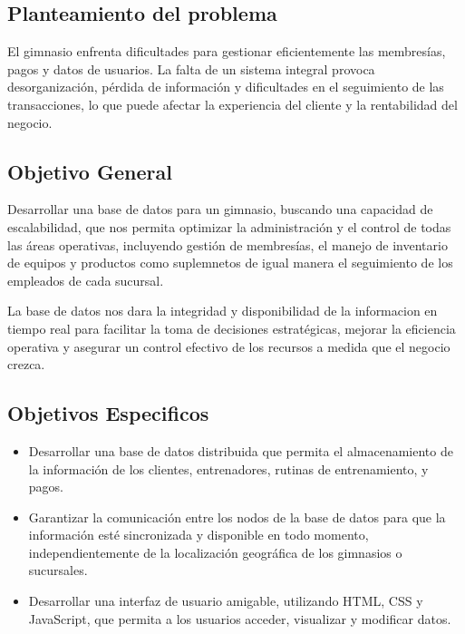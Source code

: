 \documentclass[spanish, 12pt]{article}
\providecommand{\tightlist}{\setlength{\itemsep}{0pt}
\setlength{\parskip}{0pt}}
\begin{document}
	\subsection{Planteamiento del problema}
	\label{planteamiento-del-problema}

	El gimnasio enfrenta dificultades para gestionar eficientemente las membresías,
	pagos y datos de usuarios. La falta de un sistema integral provoca
	desorganización, pérdida de información y dificultades en el seguimiento de las
	transacciones, lo que puede afectar la experiencia del cliente y la
	rentabilidad del negocio.

	\subsection{Objetivo General}
	\label{objetivo-general}

	Desarrollar una base de datos para un gimnasio, buscando una capacidad de
	escalabilidad, que nos permita optimizar la administración y el control de todas
	las áreas operativas, incluyendo gestión de membresías, el manejo de inventario
	de equipos y productos como suplemnetos de igual manera el seguimiento de los empleados
	de cada sucursal.

	La base de datos nos dara la integridad y disponibilidad de la informacion en tiempo
	real para facilitar la toma de decisiones estratégicas, mejorar la eficiencia
	operativa y asegurar un control efectivo de los recursos a medida que el
	negocio crezca.

	\subsection{Objetivos Especificos}
	\label{objetivos-especificos}

	\begin{itemize}
		\tightlist

		\item Desarrollar una base de datos distribuida que permita el almacenamiento
			de la información de los clientes, entrenadores, rutinas de entrenamiento,
			y pagos.

		\item Garantizar la comunicación entre los nodos de la base de datos para que
			la información esté sincronizada y disponible en todo momento,
			independientemente de la localización geográfica de los gimnasios o
			sucursales.

		\item Desarrollar una interfaz de usuario amigable, utilizando HTML, CSS y JavaScript,
			que permita a los usuarios acceder, visualizar y modificar datos.
	\end{itemize}
\end{document}
